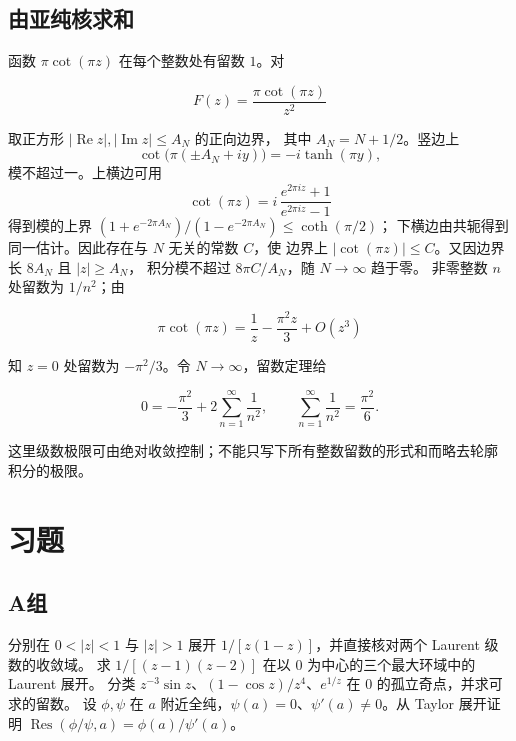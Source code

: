 \subsection{由亚纯核求和}

函数 \(\pi\cot(\pi z)\) 在每个整数处有留数 \(1\)。对

\[
 F(z)=\frac{\pi\cot(\pi z)}{z^2}
\]

取正方形 \(|\operatorname{Re}z|,|\operatorname{Im}z|\le A_N\) 的正向边界，
其中 \(A_N=N+1/2\)。竖边上
\[
 \cot\bigl(\pi(\pm A_N+iy)\bigr)=-i\tanh(\pi y),
\]
模不超过一。上横边可用
\[
 \cot(\pi z)=i\,\frac{e^{2\pi iz}+1}{e^{2\pi iz}-1}
\]
得到模的上界 \((1+e^{-2\pi A_N})/(1-e^{-2\pi A_N})\le\coth(\pi/2)\)；
下横边由共轭得到同一估计。因此存在与 \(N\) 无关的常数 \(C\)，使
边界上 \(|\cot(\pi z)|\le C\)。又因边界长 \(8A_N\) 且 \(|z|\ge A_N\)，
积分模不超过 \(8\pi C/A_N\)，随 \(N\to\infty\) 趋于零。
非零整数 \(n\) 处留数为 \(1/n^2\)；由

\[
 \pi\cot(\pi z)=\frac1z-\frac{\pi^2z}{3}+O(z^3)
\]

知 \(z=0\) 处留数为 \(-\pi^2/3\)。令 \(N\to\infty\)，留数定理给

\[
 0=-\frac{\pi^2}{3}+2\sum_{n=1}^{\infty}\frac1{n^2},
 \qquad
 \sum_{n=1}^{\infty}\frac1{n^2}=\frac{\pi^2}{6}.
\]

这里级数极限可由绝对收敛控制；不能只写下所有整数留数的形式和而略去轮廓
积分的极限。

\section*{习题}
\subsection*{A组}
\begin{enumerate}[label=\textbf{\thechapter.\arabic*.}]
分别在 \(0<|z|<1\) 与 \(|z|>1\) 展开 \(1/[z(1-z)]\)，并直接核对两个 Laurent 级数的收敛域。
求 \(1/[(z-1)(z-2)]\) 在以 \(0\) 为中心的三个最大环域中的 Laurent 展开。
分类 \(z^{-3}\sin z\)、\((1-\cos z)/z^4\)、\(e^{1/z}\) 在 \(0\) 的孤立奇点，并求可求的留数。
设 \(\phi,\psi\) 在 \(a\) 附近全纯，\(\psi(a)=0\)、\(\psi'(a)\ne0\)。从 Taylor 展开证明 \(\operatorname{Res}(\phi/\psi,a)=\phi(a)/\psi'(a)\)。
\end{enumerate}
